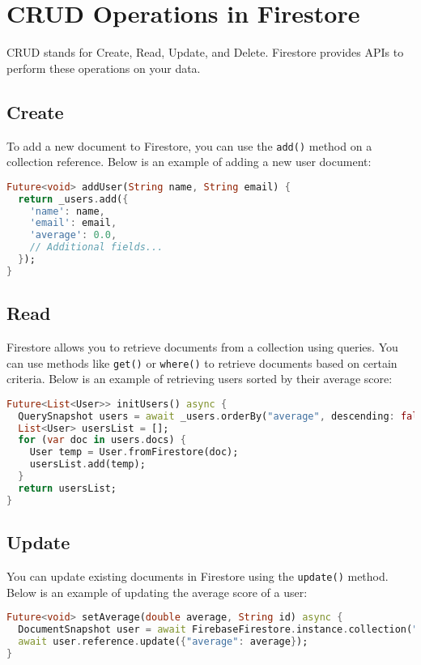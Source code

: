 \documentclass[12pt]{article}
\begin{document}
\section{CRUD Operations in Firestore}
CRUD stands for Create, Read, Update, and Delete. Firestore provides APIs to perform these operations on your data.

\subsection{Create}
To add a new document to Firestore, you can use the \texttt{add()} method on a collection reference. Below is an example of adding a new user document:

\begin{lstlisting}[language=Dart, caption={Adding a new user document}]
Future<void> addUser(String name, String email) {
  return _users.add({
    'name': name,
    'email': email,
    'average': 0.0,
    // Additional fields...
  });
}
\end{lstlisting}

\subsection{Read}
Firestore allows you to retrieve documents from a collection using queries. You can use methods like \texttt{get()} or \texttt{where()} to retrieve documents based on certain criteria. Below is an example of retrieving users sorted by their average score:

\begin{lstlisting}[language=Dart, caption={Retrieving users sorted by average score}]
Future<List<User>> initUsers() async {
  QuerySnapshot users = await _users.orderBy("average", descending: false).get();
  List<User> usersList = [];
  for (var doc in users.docs) {
    User temp = User.fromFirestore(doc);
    usersList.add(temp);
  }
  return usersList;
}
\end{lstlisting}

\subsection{Update}
You can update existing documents in Firestore using the \texttt{update()} method. Below is an example of updating the average score of a user:

\begin{lstlisting}[language=Dart, caption={Updating the average score of a user}]
Future<void> setAverage(double average, String id) async {
  DocumentSnapshot user = await FirebaseFirestore.instance.collection("users").doc(id).get();
  await user.reference.update({"average": average});
}
\end{lstlisting}
\end{document}
